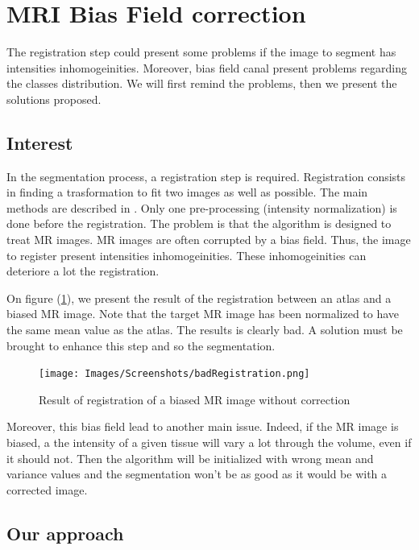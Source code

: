 \section{MRI Bias Field correction}\label{biasfieldcorrectionregistration}

The registration step could present some problems if the image to segment has intensities inhomogeinities. Moreover, bias field canal present problems regarding the classes distribution. We will first remind the problems, then we present the solutions proposed.

\subsection{Interest}

In the segmentation process, a registration step is required. Registration consists in finding a trasformation to fit two images as well as possible. The main methods are described in \cite{21}. Only one pre-processing (intensity normalization) is done before the registration. The problem is that the algorithm is designed to treat MR images. MR images are often corrupted by a bias field. Thus, the image to register present intensities inhomogeinities. These inhomogeinities can deteriore a lot the registration.
\par
On figure (\ref{fig:bfexemple}), we present the result of the registration between an atlas and a biased MR image. Note that the target MR image has been normalized to have the same mean value as the atlas. The results is clearly bad. A solution must be brought to enhance this step and so the segmentation.

  \begin{figure}[ht]\centering
  \texttt{[image: Images/Screenshots/badRegistration.png]}
  \caption{Result of registration of a biased MR image without correction}\label{fig:bfexemple}
  \end{figure}
  
\par
Moreover, this bias field lead to another main issue. Indeed, if the MR image is biased, a the intensity of a given tissue will vary a lot through the volume, even if it should not. Then the algorithm will be initialized with wrong mean and variance values and the segmentation won't be as good as it would be with a corrected image.
  
\subsection{Our approach}


